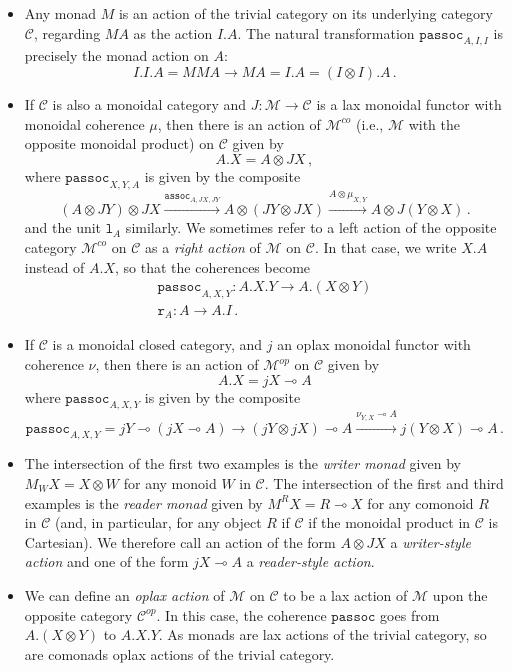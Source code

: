 \documentclass{svproc}
\newcommand\C{\mathcal{C}}
\newcommand\M{\mathcal{M}}
\newcommand{\passoc}{\texttt{passoc}}
\newcommand{\assoc}{\texttt{assoc}}
\newcommand\tensor\otimes
\newcommand\run{\texttt{r}}
\newcommand\lun{\texttt{l}}
\renewcommand\implies\multimap
\newcommand*\from{\colon}
\newcommand{\0}{{\mathtt{0}}} \newcommand{\com}{{\mathtt{com}}}
\begin{document}
\begin{example}
  \begin{itemize}
    \item Any monad $M$ is an action of the trivial category on its underlying category $\C$, regarding $MA$ as the action $I.A$.
      The natural transformation $\passoc_{A,I,I}$ is precisely the monad action on $A$:
      \[
        I.I.A = MMA \to M A = I.A = (I\tensor I).A\,.
        \]
    \item If $\C$ is also a monoidal category and $J\from \M\to \C$ is a lax monoidal functor with monoidal coherence $\mu$, then there is an action of $\M^{co}$ (i.e., $\M$ with the opposite monoidal product) on $\C$ given by
      \[
        A.X = A \tensor JX\,,
        \]
      where $\passoc_{X,Y,A}$ is given by the composite
      \[
        (A \tensor JY) \tensor JX \xrightarrow{\assoc_{A,JX,JY}}
        A \tensor (JY \tensor JX) \xrightarrow{A \tensor \mu_{X,Y}}
        A \tensor J(Y\tensor X)\,.
        \]
      and the unit $\lun_A$ similarly.  
      We sometimes refer to a left action of the opposite category $\M^{co}$ on $\C$ as a \emph{right action} of $\M$ on $\C$.  
      In that case, we write $X.A$ instead of $A.X$, so that the coherences become
      \begin{gather*}
        \passoc_{A,X,Y}\from A.X.Y \to A.(X\tensor Y)\\
        \run_A\from A \to A.I\,.
      \end{gather*}

    \item If $\C$ is a monoidal closed category, and $j$ an oplax monoidal functor with coherence $\nu$, then there is an action of $\M^{op}$ on $\C$ given by
      \[
        A.X = jX \implies A
        \]
      where $\passoc_{A,X,Y}$ is given by the composite
      \[
        \passoc_{A,X,Y}=jY \implies (jX \implies A) \to
        (jY \tensor jX) \implies A \xrightarrow{\nu_{Y,X}\implies A}
        j(Y \tensor X) \implies A\,.
        \]
    \item The intersection of the first two examples is the \emph{writer monad} given by $M_WX = X\tensor W$ for any monoid $W$ in $\C$.  
      The intersection of the first and third examples is the \emph{reader monad} given by $M^RX = R \implies X$ for any comonoid $R$ in $\C$ (and, in particular, for any object $R$ if $\C$ if the monoidal product in $\C$ is Cartesian).
      We therefore call an action of the form $A \tensor JX$ a \emph{writer-style action} and one of the form $jX \implies A$ a \emph{reader-style action}.
    \item We can define an \emph{oplax action} of $\M$ on $\C$ to be a lax action of $\M$ upon the opposite category $\C^{op}$.  
      In this case, the coherence $\passoc$ goes from $A.(X\tensor Y)$ to $A.X.Y$.  
      As monads are lax actions of the trivial category, so are comonads oplax actions of the trivial category.


\end{itemize}
\end{example}
\end{document}
